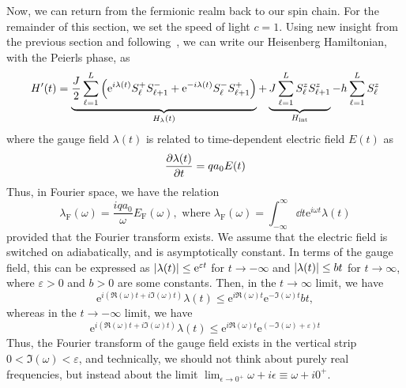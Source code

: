 Now, we can return from the fermionic realm back to our spin chain. For the remainder of this section, we set
the speed of light \(c = 1\). Using new insight from the previous section and following~\textcite{Gohmann2022}, we can write our Heisenberg
Hamiltonian, with the Peierls phase, as
\begin{equation}
    H^{\prime}(t) = \underbrace{\frac{J}{2} \sum_{\ell=1}^{L} \left(\mathrm{e}^{i \lambda(t)} S^{+}_{\ell} S^{-}_{\ell+1} + \mathrm{e}^{-i \lambda(t)} S^{-}_{\ell}S^{+}_{\ell+1} \right)}_{H_{\lambda }(t)}
    + \underbrace{J \sum_{\ell=1}^{L} S^{z}_{\ell}S^{z}_{\ell+1}}_{H_{\text{int}}}
    - h \sum_{\ell=1}^{L} S^{z}_{\ell}
\end{equation}
where the gauge field \(\lambda(t)\) is related to time-dependent electric field \(E(t)\) as
\begin{equation}
    \pdv{\lambda(t)}{t} =  q a_0 E(t)
\end{equation}
Thus, in Fourier space, we have the relation
\begin{equation}
    \lambda_{\mathrm{F}} (\omega) = \frac{i q a_0}{\omega} E_{\mathrm{F}} (\omega), \text{ where } \lambda_{\mathrm{F}} (\omega) = \int_{-\infty}^{\infty} \dd{t} \mathrm{e}^{i \omega t} \lambda(t)
\end{equation}
provided that the Fourier transform exists. We assume that the electric field is switched on adiabatically, and
is asymptotically constant. In terms of the gauge field, this can be expressed as
\(\abs{\lambda (t)} \leq \mathrm{e}^{\varepsilon t} \) for \(t\to -\infty \) and
\(\abs{\lambda (t)} \leq b t \) for \(t\to \infty \), where \(\varepsilon > 0\) and \(b>0\) are some constants.
Then, in the \( t \to \infty \) limit, we have \[\mathrm{e}^{i (\Re(\omega) t + i \Im(\omega) t )} \lambda (t)
    \leq \mathrm{e}^{i \Re (\omega) t}  \mathrm{e}^{- \Im (\omega)  t} b t,\]
whereas in the \(t \to -\infty \) limit,
we have \[\mathrm{e}^{i (\Re (\omega) t + i \Im (\omega) t )} \lambda (t) \leq \mathrm{e}^{i \Re (\omega) t}
    \mathrm{e}^{(- \Im (\omega) + \varepsilon )t}\]
Thus, the Fourier transform of the gauge field exists in the
vertical strip \(0 < \Im (\omega) < \varepsilon \), and technically, we should not think about purely
real frequencies, but instead about the limit \(\lim_{\epsilon \to 0^+} \omega + i \epsilon \equiv \omega + i0^{+}  \).

